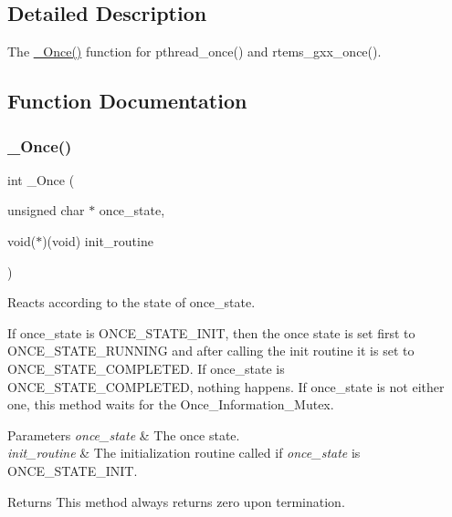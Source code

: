 \subsection{Detailed Description}
The \mbox{\hyperlink{group__RTEMSScoreOnce_ga2db8aad33d5d118be8a81b4b32caea85}{\+\_\+\+Once()}} function for pthread\+\_\+once() and rtems\+\_\+gxx\+\_\+once(). 



\subsection{Function Documentation}
\mbox{\label{group__RTEMSScoreOnce_ga2db8aad33d5d118be8a81b4b32caea85}} 
\subsubsection{\texorpdfstring{\_Once()}{\_Once()}}
{\footnotesize\ttfamily int \+\_\+\+Once (\begin{DoxyParamCaption}\item[{unsigned char $\ast$}]{once\+\_\+state,  }\item[{void($\ast$)(void)}]{init\+\_\+routine }\end{DoxyParamCaption})}



Reacts according to the state of once\+\_\+state. 

If once\+\_\+state is O\+N\+C\+E\+\_\+\+S\+T\+A\+T\+E\+\_\+\+I\+N\+IT, then the once state is set first to O\+N\+C\+E\+\_\+\+S\+T\+A\+T\+E\+\_\+\+R\+U\+N\+N\+I\+NG and after calling the init routine it is set to O\+N\+C\+E\+\_\+\+S\+T\+A\+T\+E\+\_\+\+C\+O\+M\+P\+L\+E\+T\+ED. If once\+\_\+state is O\+N\+C\+E\+\_\+\+S\+T\+A\+T\+E\+\_\+\+C\+O\+M\+P\+L\+E\+T\+ED, nothing happens. If once\+\_\+state is not either one, this method waits for the Once\+\_\+\+Information\+\_\+\+Mutex.


\begin{DoxyParams}{Parameters}
{\em once\+\_\+state} & The once state. \\
\hline
{\em init\+\_\+routine} & The initialization routine called if {\itshape once\+\_\+state} is O\+N\+C\+E\+\_\+\+S\+T\+A\+T\+E\+\_\+\+I\+N\+IT.\\
\hline
\end{DoxyParams}
\begin{DoxyReturn}{Returns}
This method always returns zero upon termination. 
\end{DoxyReturn}
\mbox{\label{group__RTEMSScoreOnce_ga0af2868af507faa6429f26441dbea13c}} 
